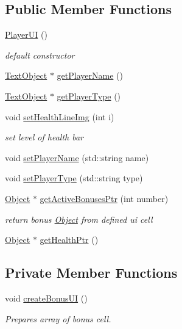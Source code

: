 \subsection*{Public Member Functions}
\begin{DoxyCompactItemize}
\item 
\mbox{\label{class_player_u_i_a6258658ac25fa64b122bffdf8e1e41fc}} 
\hyperlink{class_player_u_i_a6258658ac25fa64b122bffdf8e1e41fc}{Player\+UI} ()
\begin{DoxyCompactList}\small\item\em default constructor \end{DoxyCompactList}\item 
\hyperlink{class_text_object}{Text\+Object} $\ast$ \hyperlink{class_player_u_i_a757ad508c40877d30f9f8b45f8afeccf}{get\+Player\+Name} ()
\item 
\hyperlink{class_text_object}{Text\+Object} $\ast$ \hyperlink{class_player_u_i_a45451abaa9482efb72379df93c2ca37e}{get\+Player\+Type} ()
\item 
void \hyperlink{class_player_u_i_a5cb795f694ec795a49591e6c3a7c7e64}{set\+Health\+Line\+Img} (int i)
\begin{DoxyCompactList}\small\item\em set level of health bar \end{DoxyCompactList}\item 
void \hyperlink{class_player_u_i_ae89b4bc3d9337f7010c504f6dd89e473}{set\+Player\+Name} (std\+::string name)
\item 
void \hyperlink{class_player_u_i_ab43462a4fd71580e29c06f6516f279b4}{set\+Player\+Type} (std\+::string type)
\item 
\hyperlink{class_object}{Object} $\ast$ \hyperlink{class_player_u_i_aebce345a44f53a6ae0a6ac495aa6e17a}{get\+Active\+Bonuses\+Ptr} (int number)
\begin{DoxyCompactList}\small\item\em return bonus \hyperlink{class_object}{Object} from defined ui cell \end{DoxyCompactList}\item 
\hyperlink{class_object}{Object} $\ast$ \hyperlink{class_player_u_i_a013d923f183d6fb7f6e2a2cc2d1dd806}{get\+Health\+Ptr} ()
\end{DoxyCompactItemize}
\subsection*{Private Member Functions}
\begin{DoxyCompactItemize}
\item 
\mbox{\label{class_player_u_i_a6d4c17615d2bf85c7db65d6e3557d5f0}} 
void \hyperlink{class_player_u_i_a6d4c17615d2bf85c7db65d6e3557d5f0}{create\+Bonus\+UI} ()
\begin{DoxyCompactList}\small\item\em Prepares array of bonus cell. \end{DoxyCompactList}\end{DoxyCompactItemize}
